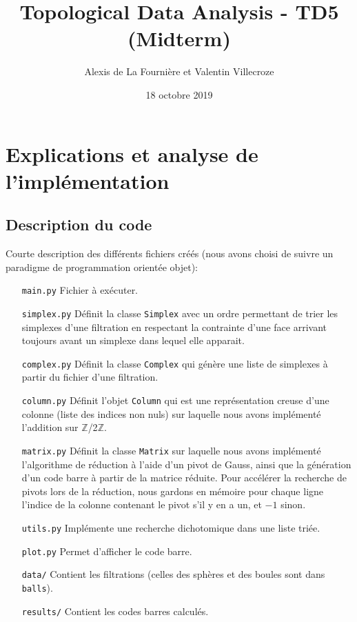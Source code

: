 \documentclass[french, a4paper, 12pt]{article}
\begin{document}
\title{Topological Data Analysis - TD5 (Midterm)}
\author{Alexis de La Fournière et Valentin Villecroze}
\date{18 octobre 2019}
\maketitle


\section{Explications et analyse de l'implémentation}

\subsection{Description du code}
Courte description des différents fichiers créés (nous avons choisi 
de suivre un paradigme de programmation orientée objet):
\vskip 0.5cm
\begin{itemize}
    \item[\texttt{main.py}] Fichier à exécuter.
    \item[\texttt{simplex.py}] Définit la classe \texttt{Simplex} 
    avec un ordre permettant de trier les simplexes d'une filtration
    en respectant la contrainte d'une face arrivant toujours avant
    un simplexe dans lequel elle apparait. 
    \item[\texttt{complex.py}] Définit la classe \texttt{Complex} qui 
    génère une liste de simplexes à partir du fichier d'une filtration. 
    \item[\texttt{column.py}] Définit l'objet \texttt{Column} qui
    est une représentation creuse d'une colonne (liste des
    indices non nuls) sur laquelle nous avons implémenté l'addition
    sur $\mathbb{Z}$/2$\mathbb{Z}$. 
    \item[\texttt{matrix.py}] Définit la classe \texttt{Matrix} sur
    laquelle nous avons implémenté l'algorithme de réduction à l'aide
    d'un pivot de Gauss, ainsi que la génération d'un code barre à
    partir de la matrice réduite. Pour accélérer la recherche de 
    pivots lors de la réduction, nous gardons en mémoire pour
    chaque ligne l'indice de la colonne contenant le pivot s'il y
    en a un, et $-1$ sinon.
    \item[\texttt{utils.py}] Implémente une recherche dichotomique
    dans une liste triée. 
    \item[\texttt{plot.py}] Permet d'afficher le code barre. 
    \vskip 0.5cm
    \item[\texttt{data/}] Contient les filtrations (celles des 
    sphères et des boules sont dans \texttt{balls}).
    \item[\texttt{results/}] Contient les codes barres calculés.
\end{itemize}
\end{document}

